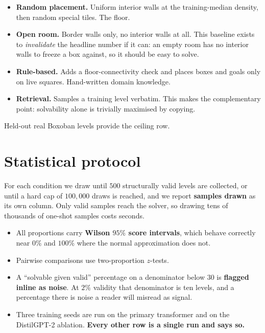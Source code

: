 \documentclass[11pt,a4paper]{report}
\begin{document}
\begin{itemize}[leftmargin=1.5em,itemsep=2pt]
\item \textbf{Random placement.} Uniform interior walls at the training-median
      density, then random special tiles. The floor.
\item \textbf{Open room.} Border walls only, no interior walls at all. This
      baseline exists to \emph{invalidate} the headline number if it can: an
      empty room has no interior walls to freeze a box against, so it should be
      easy to solve.
\item \textbf{Rule-based.} Adds a floor-connectivity check and places boxes
      and goals only on live squares. Hand-written domain knowledge.
\item \textbf{Retrieval.} Samples a training level verbatim. This makes the
      complementary point: solvability alone is trivially maximised by copying.
\end{itemize}

Held-out real Boxoban levels provide the ceiling row.

\section{Statistical protocol}

For each condition we draw until $500$ structurally valid levels are collected,
or until a hard cap of $100{,}000$ draws is reached, and we report
\textbf{samples drawn} as its own column. Only valid samples reach the solver, so
drawing tens of thousands of one-shot samples costs seconds.

\begin{itemize}[leftmargin=1.5em,itemsep=1pt]
\item All proportions carry \textbf{Wilson $95\%$ score intervals}, which behave
      correctly near $0\%$ and $100\%$ where the normal approximation does not.
\item Pairwise comparisons use two-proportion $z$-tests.
\item A ``solvable given valid'' percentage on a denominator below $30$ is
      \textbf{flagged inline as noise}. At $2\%$ validity that denominator is ten
      levels, and a percentage there is noise a reader will misread as signal.
\item Three training seeds are run on the primary transformer and on the
      DistilGPT-2 ablation. \textbf{Every other row is a single run and says so.}
\end{itemize}
\end{document}
